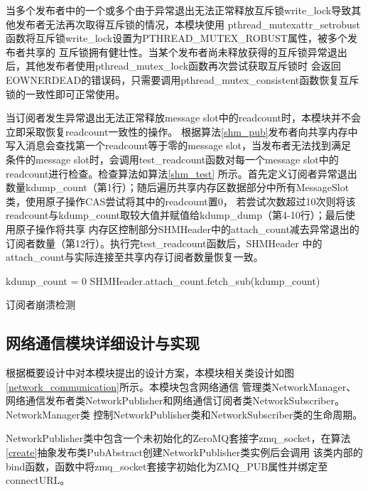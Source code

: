 当多个发布者中的一个或多个由于异常退出无法正常释放互斥锁write\_lock导致其他发布者无法再次取得互斥锁的情况，本模块使用
pthread\_mutexattr\_setrobust函数将互斥锁write\_lock设置为PTHREAD\_MUTEX\_ROBUST属性，被多个发布者共享的
互斥锁拥有健壮性。当某个发布者尚未释放获得的互斥锁异常退出后，其他发布者使用pthread\_mutex\_lock函数再次尝试获取互斥锁时
会返回EOWNERDEAD的错误码，只需要调用pthread\_mutex\_consistent函数恢复互斥锁的一致性即可正常使用。

当订阅者发生异常退出无法正常释放message slot中的readcount时，本模块并不会立即采取恢复readcount一致性的操作。
根据算法\ref{shm_pub}发布者向共享内存中写入消息会查找第一个readcount等于零的message slot，当发布者无法找到满足
条件的message slot时，会调用test\_readcount函数对每一个message slot中的readcount进行检查。检查算法如算法\ref{shm_test}
所示。首先定义订阅者异常退出数量kdump\_count（第1行）；随后遍历共享内存区数据部分中所有MessageSlot类，使用原子操作CAS尝试将其中的readcount置0，
若尝试次数超过10次则将该readcount与kdump\_count取较大值并赋值给kdump\_dump（第4-10行）；最后使用原子操作将共享
内存区控制部分SHMHeader中的attach\_count减去异常退出的订阅者数量（第12行）。执行完test\_readcount函数后，SHMHeader
中的attach\_count与实际连接至共享内存订阅者数量恢复一致。
\begin{algorithm}
  \small
  \SetAlgoLined
  kdump\_count = 0\;
  SHMHeader.attach\_count.fetch\_sub(kdump\_count)\;
  \caption{订阅者崩溃检测}
  \label{shm_test}
\end{algorithm}

\subsection{网络通信模块详细设计与实现}
根据概要设计中对本模块提出的设计方案，本模块相关类设计如图\ref{network_communication}所示。本模块包含网络通信
管理类NetworkManager、网络通信发布者类NetworkPublisher和网络通信订阅者类NetworkSubscriber。NetworkManager类
控制NetworkPublisher类和NetworkSubscriber类的生命周期。

NetworkPublisher类中包含一个未初始化的ZeroMQ套接字zmq\_socket，在算法\ref{create}抽象发布类PubAbstract创建NetworkPublisher类实例后会调用
该类内部的bind函数，函数中将zmq\_socket套接字初始化为ZMQ\_PUB属性并绑定至connectURL。

